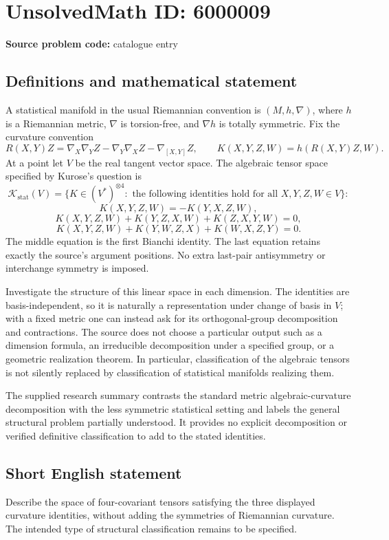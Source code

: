 \documentclass[11pt]{article}
\begin{document}
\section*{UnsolvedMath ID: 6000009}
\textbf{Source problem code:} catalogue entry
\subsection{Definitions and mathematical statement}
A statistical manifold in the usual Riemannian convention is \((M,h,\nabla)\), where \(h\) is a Riemannian metric, \(\nabla\) is torsion-free, and \(\nabla h\) is totally symmetric. Fix the curvature convention
\[
R(X,Y)Z=\nabla_X\nabla_YZ-\nabla_Y\nabla_XZ-\nabla_{[X,Y]}Z,
\qquad K(X,Y,Z,W)=h(R(X,Y)Z,W).
\]
At a point let \(V\) be the real tangent vector space. The algebraic tensor space specified by Kurose's question is
\[
\mathcal K_{\mathrm{stat}}(V)=\{K\in(V^*)^{\otimes4}:\text{ the following identities hold for all }X,Y,Z,W\in V\}:
\]
\[
K(X,Y,Z,W)=-K(Y,X,Z,W),
\]
\[
K(X,Y,Z,W)+K(Y,Z,X,W)+K(Z,X,Y,W)=0,
\]
\[
K(X,Y,Z,W)+K(Y,W,Z,X)+K(W,X,Z,Y)=0.
\]
The middle equation is the first Bianchi identity. The last equation retains exactly the source's argument positions. No extra last-pair antisymmetry or interchange symmetry is imposed.

Investigate the structure of this linear space in each dimension. The identities are basis-independent, so it is naturally a representation under change of basis in \(V\); with a fixed metric one can instead ask for its orthogonal-group decomposition and contractions. The source does not choose a particular output such as a dimension formula, an irreducible decomposition under a specified group, or a geometric realization theorem. In particular, classification of the algebraic tensors is not silently replaced by classification of statistical manifolds realizing them.

The supplied research summary contrasts the standard metric algebraic-curvature decomposition with the less symmetric statistical setting and labels the general structural problem partially understood. It provides no explicit decomposition or verified definitive classification to add to the stated identities.
\subsection{Short English statement}
Describe the space of four-covariant tensors satisfying the three displayed curvature identities, without adding the symmetries of Riemannian curvature. The intended type of structural classification remains to be specified.
\end{document}
